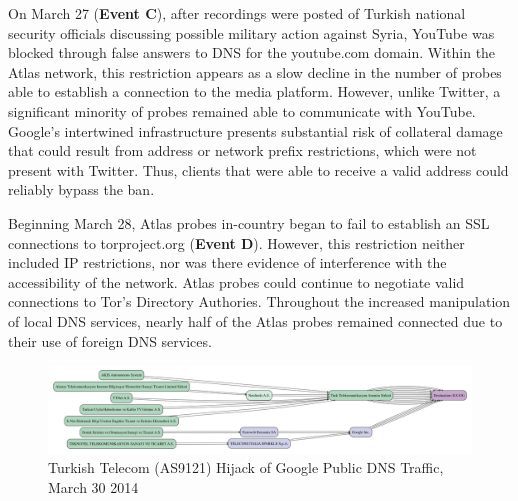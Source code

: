 On March 27 (\textbf{Event C}), after recordings were posted of Turkish
national security officials discussing possible military action against Syria,
YouTube was blocked through false answers to DNS for the youtube.com domain.
Within the Atlas network, this restriction appears as a slow decline in the
number of probes able to establish a connection to the media platform. However, unlike Twitter, a
significant minority of probes remained able to communicate with YouTube.
Google's intertwined infrastructure presents substantial risk of collateral damage that could result from address or network prefix restrictions, which were not
present with Twitter. Thus, clients that were able to receive a valid address could reliably bypass the ban.

Beginning
March 28, Atlas probes in-country began to fail to establish an SSL
connections to torproject.org (\textbf{Event D}). However, this restriction
neither included IP restrictions, nor was there evidence of interference with
the accessibility of the network. Atlas probes could continue to negotiate
valid connections to Tor's Directory Authories. Throughout the increased
manipulation of local DNS services, nearly half of the Atlas probes remained
connected due to their use of foreign DNS services.

\begin{figure}
  \includegraphics[width=\textwidth]{resources/traceroute-TR-google_public_dns-20140330-hijack.png}
  \caption{Turkish Telecom (AS9121) Hijack of Google Public DNS Traffic, March 30 2014}
  \label{image:tr-ttnet_hijack}
\end{figure}

